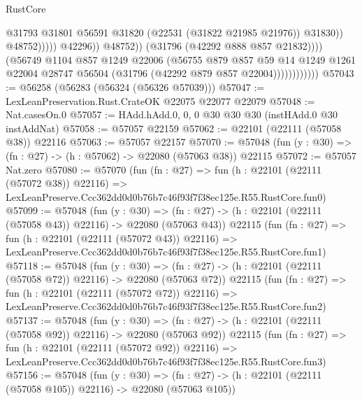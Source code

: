 \begin{lexlean}{RustCore}
\begin{coremodule}
                                              @31793
                                              @31801
                                              @56591
                                              @31820
                                              (@22531 (@31822 @21985 @21976))
                                              @31830))
                                          @48752)))))
                                @42296))
                            @48752))
                        (@31796 (@42292 @888 @857 @21832))))
                    (@56749
                      @1104
                      @857
                      @1249
                      @22006
                      (@56755
                        @879
                        @857
                        @59
                        @14
                        @1249
                        @1261
                        @22004
                        @28747
                        @56504
                        (@31796 (@42292 @879 @857 @22004))))))))))))
@57043 := @56258 (@56283 (@56324 (@56326 @57039)))
@57047 := LexLeanPreservation.Rust.CrateOK @22075 @22077 @22079
@57048 := Nat.casesOn.{0}
@57057 := HAdd.hAdd.{0, 0, 0} @30 @30 @30 (instHAdd.{0} @30 instAddNat)
@57058 := @57057 @22159
@57062 := @22101 (@22111 (@57058 @38)) @22116
@57063 := @57057 @22157
@57070 := @57048 (fun (y : @30) => (fn : @27) -> (h : @57062) -> @22080 (@57063 @38)) @22115
@57072 := @57057 Nat.zero
@57080 := @57070
    (fun (fn : @27) =>
    fun (h : @22101 (@22111 (@57072 @38)) @22116) =>
    LexLeanPreserve.Ccc362dd0d0b76b7c46f93f7f38ec125e.R55.RustCore.fun0)
@57099 := @57048
    (fun (y : @30) =>
    (fn : @27) -> (h : @22101 (@22111 (@57058 @43)) @22116) -> @22080 (@57063 @43))
    @22115
    (fun (fn : @27) =>
    fun (h : @22101 (@22111 (@57072 @43)) @22116) =>
    LexLeanPreserve.Ccc362dd0d0b76b7c46f93f7f38ec125e.R55.RustCore.fun1)
@57118 := @57048
    (fun (y : @30) =>
    (fn : @27) -> (h : @22101 (@22111 (@57058 @72)) @22116) -> @22080 (@57063 @72))
    @22115
    (fun (fn : @27) =>
    fun (h : @22101 (@22111 (@57072 @72)) @22116) =>
    LexLeanPreserve.Ccc362dd0d0b76b7c46f93f7f38ec125e.R55.RustCore.fun2)
@57137 := @57048
    (fun (y : @30) =>
    (fn : @27) -> (h : @22101 (@22111 (@57058 @92)) @22116) -> @22080 (@57063 @92))
    @22115
    (fun (fn : @27) =>
    fun (h : @22101 (@22111 (@57072 @92)) @22116) =>
    LexLeanPreserve.Ccc362dd0d0b76b7c46f93f7f38ec125e.R55.RustCore.fun3)
@57156 := @57048
    (fun (y : @30) =>
    (fn : @27) -> (h : @22101 (@22111 (@57058 @105)) @22116) -> @22080 (@57063 @105))

\end{coremodule}
\end{lexlean}
